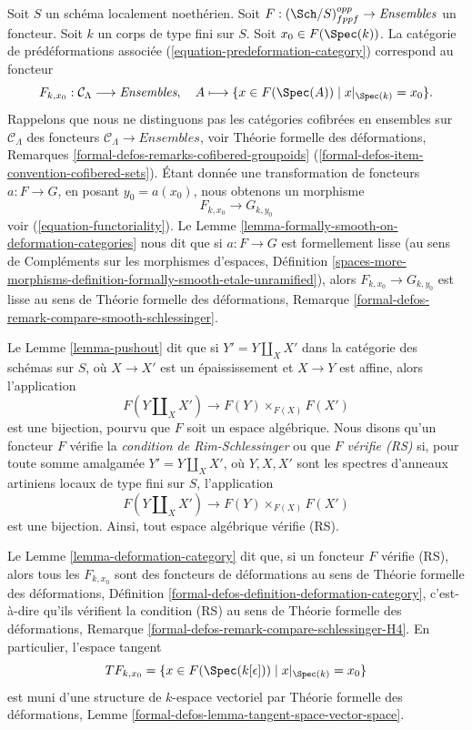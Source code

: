 \medskip\noindent
Soit $S$ un schéma localement noethérien. Soit
$F : (\Sch/S)_{fppf}^{opp} \to \textit{Ensembles}$ un foncteur. Soit $k$ un
corps de type fini sur $S$. Soit $x_0 \in F(\Spec(k))$.
La catégorie de prédéformations associée (\ref{equation-predeformation-category})
correspond au foncteur
$$
F_{k, x_0} : \mathcal{C}_\Lambda \longrightarrow \textit{Ensembles},
\quad
A \longmapsto \{x \in F(\Spec(A)) \mid x|_{\Spec(k)} = x_0 \}.
$$
Rappelons que nous ne distinguons pas
les catégories cofibrées en ensembles sur $\mathcal{C}_\Lambda$
des foncteurs $\mathcal{C}_\Lambda \to \textit{Ensembles}$,
voir Théorie formelle des déformations, Remarques
\ref{formal-defos-remarks-cofibered-groupoids}
(\ref{formal-defos-item-convention-cofibered-sets}).
Étant donnée une transformation de foncteurs $a : F \to G$, en posant
$y_0 = a(x_0)$, nous obtenons un morphisme
$$
F_{k, x_0} \longrightarrow G_{k, y_0}
$$
voir (\ref{equation-functoriality}).
Le Lemme \ref{lemma-formally-smooth-on-deformation-categories} nous dit que si
$a : F \to G$ est formellement lisse (au sens de
Compléments sur les morphismes d'espaces, Définition
\ref{spaces-more-morphisms-definition-formally-smooth-etale-unramified}), alors
$F_{k, x_0} \longrightarrow G_{k, y_0}$ est lisse au sens de
Théorie formelle des déformations, Remarque
\ref{formal-defos-remark-compare-smooth-schlessinger}.

\medskip\noindent
Le Lemme \ref{lemma-pushout} dit que si $Y' = Y \amalg_X X'$ dans la
catégorie des schémas sur $S$, où $X \to X'$ est un épaississement et
$X \to Y$ est affine, alors l'application
$$
F(Y \amalg_X X') \to F(Y) \times_{F(X)} F(X')
$$
est une bijection, pourvu que $F$ soit un espace algébrique.
Nous disons qu'un foncteur $F$ vérifie la {\it condition de Rim-Schlessinger}
ou que $F$ {\it vérifie (RS)} si, pour toute
somme amalgamée $Y' = Y \amalg_X X'$, où $Y, X, X'$ sont les spectres d'anneaux
artiniens locaux de type fini sur $S$, l'application
$$
F(Y \amalg_X X') \to F(Y) \times_{F(X)} F(X')
$$
est une bijection. Ainsi, tout espace algébrique vérifie (RS).

\medskip\noindent
Le Lemme \ref{lemma-deformation-category} dit que, si
un foncteur $F$ vérifie (RS), alors tous les $F_{k, x_0}$
sont des foncteurs de déformations au sens de
Théorie formelle des déformations, Définition
\ref{formal-defos-definition-deformation-category}, c'est-à-dire qu'ils vérifient
la condition (RS) au sens de
Théorie formelle des déformations, Remarque
\ref{formal-defos-remark-compare-schlessinger-H4}.
En particulier, l'espace tangent
$$
TF_{k, x_0} = \{x \in F(\Spec(k[\epsilon])) \mid x|_{\Spec(k)} = x_0\}
$$
est muni d'une structure de $k$-espace vectoriel par Théorie formelle des déformations,
Lemme \ref{formal-defos-lemma-tangent-space-vector-space}.

